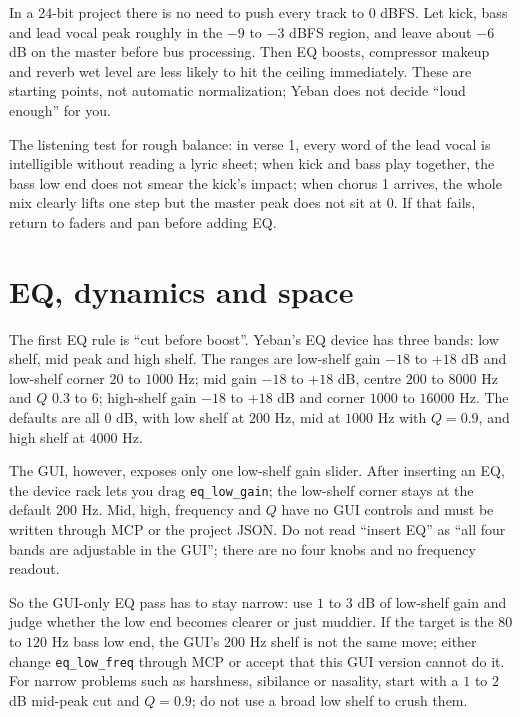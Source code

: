 In a 24-bit project there is no need to push every track to $0$ dBFS. Let kick, bass and lead vocal peak roughly in the $-9$ to $-3$ dBFS region, and leave about $-6$ dB on the master before bus processing. Then EQ boosts, compressor makeup and reverb wet level are less likely to hit the ceiling immediately. These are starting points, not automatic normalization; Yeban does not decide ``loud enough'' for you.

The listening test for rough balance: in verse 1, every word of the lead vocal is intelligible without reading a lyric sheet; when kick and bass play together, the bass low end does not smear the kick's impact; when chorus 1 arrives, the whole mix clearly lifts one step but the master peak does not sit at $0$. If that fails, return to faders and pan before adding EQ.


\section{EQ, dynamics and space}

The first EQ rule is ``cut before boost''. Yeban's EQ device has three bands: low shelf, mid peak and high shelf. The ranges are low-shelf gain $-18$ to $+18$ dB and low-shelf corner $20$ to $1000$ Hz; mid gain $-18$ to $+18$ dB, centre $200$ to $8000$ Hz and $Q$ $0.3$ to $6$; high-shelf gain $-18$ to $+18$ dB and corner $1000$ to $16000$ Hz. The defaults are all $0$ dB, with low shelf at $200$ Hz, mid at $1000$ Hz with $Q=0.9$, and high shelf at $4000$ Hz.

The GUI, however, exposes only one low-shelf gain slider. After inserting an EQ, the device rack lets you drag \texttt{eq\_low\_gain}; the low-shelf corner stays at the default $200$ Hz. Mid, high, frequency and $Q$ have no GUI controls and must be written through MCP or the project JSON. Do not read ``insert EQ'' as ``all four bands are adjustable in the GUI''; there are no four knobs and no frequency readout.

So the GUI-only EQ pass has to stay narrow: use $1$ to $3$ dB of low-shelf gain and judge whether the low end becomes clearer or just muddier. If the target is the $80$ to $120$ Hz bass low end, the GUI's $200$ Hz shelf is not the same move; either change \texttt{eq\_low\_freq} through MCP or accept that this GUI version cannot do it. For narrow problems such as harshness, sibilance or nasality, start with a $1$ to $2$ dB mid-peak cut and $Q=0.9$; do not use a broad low shelf to crush them.

